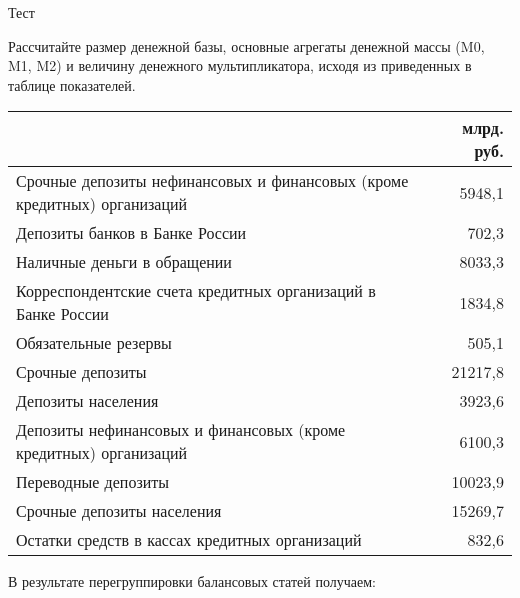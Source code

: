 \documentclass[12pt, table]{exam}
\begin{document}
\setcounter{section}{0\relax}%
\noindent
\normalsize

\begin{questions}
\question[40] Тест
\answerstotest

\pagebreak
\question[15] Рассчитайте размер денежной базы, основные агрегаты денежной массы (M0, M1, M2) и величину денежного мультипликатора, исходя из приведенных в таблице показателей.

\small
\begin{tabularx}{\linewidth}[b]{@{}>{\raggedright\arraybackslash}Xr@{}}		& млрд. руб.\\
	\toprule
	Срочные депозиты нефинансовых и финансовых (кроме кредитных) организаций & 5948,1 \\
	Депозиты банков в Банке России & 702,3 \\
	Наличные деньги в обращении & 8033,3 \\
	Корреспондентские счета кредитных организаций в Банке России & 1834,8 \\
	Обязательные резервы & 505,1 \\
	Срочные депозиты & 21217,8 \\
	Депозиты населения & 3923,6 \\
	Депозиты нефинансовых и финансовых (кроме кредитных) организаций & 6100,3 \\
	Переводные депозиты & 10023,9 \\
	Срочные депозиты населения & 15269,7 \\
	Остатки средств в кассах кредитных организаций & 832,6 \\
	\bottomrule
\end{tabularx}%
\normalsize
\begin{solution}[23em] В результате перегруппировки балансовых статей получаем:


\end{solution}
\end{questions}
\end{document}
